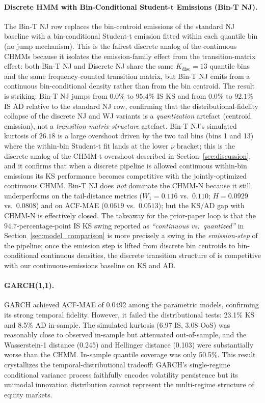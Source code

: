 \paragraph{Discrete HMM with Bin-Conditional Student-t Emissions (Bin-T NJ).}
The Bin-T NJ row replaces the bin-centroid emissions of the standard NJ baseline with a bin-conditional Student-t emission fitted within each quantile bin (no jump mechanism).
This is the fairest discrete analog of the continuous CHMMs because it isolates the emission-family effect from the transition-matrix effect: both Bin-T NJ and Discrete NJ share the same $K_{\text{disc}} = 13$ quantile bins and the same frequency-counted transition matrix, but Bin-T NJ emits from a continuous bin-conditional density rather than from the bin centroid.
The result is striking: Bin-T NJ jumps from $0.0\%$ to $95.4\%$ IS KS and from $0.0\%$ to $92.1\%$ IS AD relative to the standard NJ row, confirming that the distributional-fidelity collapse of the discrete NJ and WJ variants is a \emph{quantization} artefact (centroid emission), not a \emph{transition-matrix-structure} artefact.
Bin-T NJ's simulated kurtosis of $26.18$ is a large overshoot driven by the two tail bins (bins 1 and 13) where the within-bin Student-t fit lands at the lower $\nu$ bracket; this is the discrete analog of the CHMM-t overshoot described in Section~\ref{sec:discussion}, and it confirms that when a discrete pipeline is allowed continuous within-bin emissions its KS performance becomes competitive with the jointly-optimized continuous CHMM.
Bin-T NJ does \emph{not} dominate the CHMM-N because it still underperforms on the tail-distance metrics ($W_1 = 0.116$ vs.\ $0.110$; $H = 0.0929$ vs.\ $0.0808$) and on ACF-MAE ($0.0619$ vs.\ $0.0513$); but the KS/AD gap with CHMM-N is effectively closed.
The takeaway for the prior-paper loop is that the $94.7$-percentage-point IS KS swing reported as \emph{``continuous vs.\ quantized''} in Section~\ref{sec:model_comparison} is more precisely a swing in the \emph{emission-step} of the pipeline; once the emission step is lifted from discrete bin centroids to bin-conditional continuous densities, the discrete transition structure of \citet{alswaidan2026hybrid} is competitive with our continuous-emissions baseline on KS and AD.

\paragraph{GARCH(1,1).}
GARCH achieved ACF-MAE of 0.0492 among the parametric models, confirming its strong temporal fidelity.
However, it failed the distributional tests: 23.1\% KS and 8.5\% AD in-sample.
The simulated kurtosis (6.97 IS, 3.08 OoS) was reasonably close to observed in-sample but attenuated out-of-sample, and the Wasserstein-1 distance (0.245) and Hellinger distance (0.103) were substantially worse than the CHMM.
In-sample quantile coverage was only 50.5\%.
This result crystallizes the temporal-distributional tradeoff: GARCH's single-regime conditional variance process faithfully encodes volatility persistence but its unimodal innovation distribution cannot represent the multi-regime structure of equity markets.

